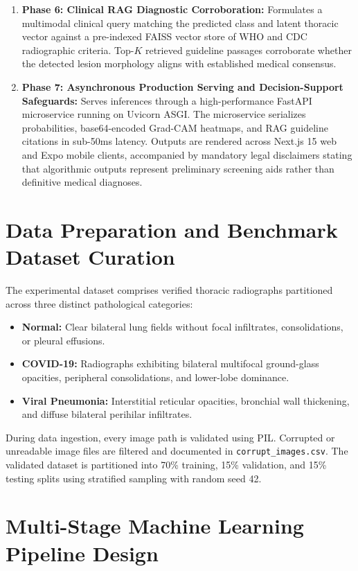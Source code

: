 \documentclass[12pt,a4paper]{report}
\begin{document}
\begin{enumerate}
    \item \textbf{Phase 6: Clinical RAG Diagnostic Corroboration:} Formulates a multimodal clinical query matching the predicted class and latent thoracic vector against a pre-indexed FAISS vector store of WHO and CDC radiographic criteria. Top-$K$ retrieved guideline passages corroborate whether the detected lesion morphology aligns with established medical consensus.
    \item \textbf{Phase 7: Asynchronous Production Serving and Decision-Support Safeguards:} Serves inferences through a high-performance FastAPI microservice running on Uvicorn ASGI. The microservice serializes probabilities, base64-encoded Grad-CAM heatmaps, and RAG guideline citations in sub-50ms latency. Outputs are rendered across Next.js 15 web and Expo mobile clients, accompanied by mandatory legal disclaimers stating that algorithmic outputs represent preliminary screening aids rather than definitive medical diagnoses.
\end{enumerate}

\section{Data Preparation and Benchmark Dataset Curation}
The experimental dataset comprises verified thoracic radiographs partitioned across three distinct pathological categories:
\begin{itemize}
    \item \textbf{Normal:} Clear bilateral lung fields without focal infiltrates, consolidations, or pleural effusions.
    \item \textbf{COVID-19:} Radiographs exhibiting bilateral multifocal ground-glass opacities, peripheral consolidations, and lower-lobe dominance.
    \item \textbf{Viral Pneumonia:} Interstitial reticular opacities, bronchial wall thickening, and diffuse bilateral perihilar infiltrates.
\end{itemize}

During data ingestion, every image path is validated using PIL. Corrupted or unreadable image files are filtered and documented in \texttt{corrupt\_images.csv}. The validated dataset is partitioned into 70\% training, 15\% validation, and 15\% testing splits using stratified sampling with random seed 42.

\section{Multi-Stage Machine Learning Pipeline Design}
\end{document}
